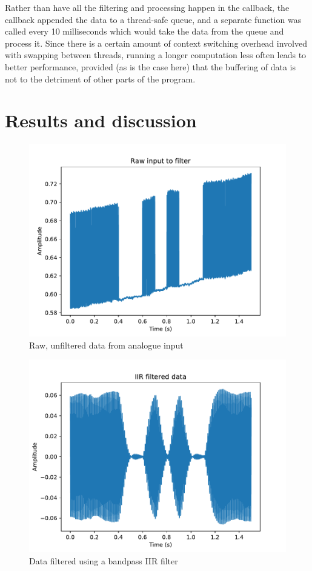 \documentclass{article}
\begin{document}
\begin{multicols}{2}
Rather than have all the filtering and processing happen in the callback, the callback appended the data to a thread-safe queue, and a separate function was called every 10 milliseconds which would take the data from the queue and process it. Since there is a certain amount of context switching overhead involved with swapping between threads, running a longer computation less often leads to better performance, provided (as is the case here) that the buffering of data is not to the detriment of other parts of the program. 

\section{Results and discussion}
\begin{figure}[H]
    \includegraphics[width=\linewidth]{figures/raw.pdf}
    \caption{Raw, unfiltered data from analogue input}
    \label{fig:raw}
\end{figure}

\begin{figure}[H]
    \includegraphics[width=\linewidth]{figures/filtered.pdf}
    \caption{Data filtered using a bandpass IIR filter}
    \label{fig:filtered}
\end{figure}


\end{multicols}
\end{document}
